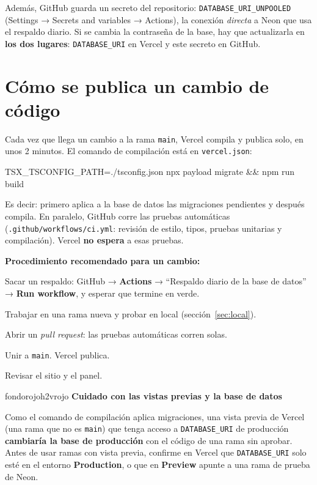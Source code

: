 \documentclass[11pt,letterpaper]{article}
\newcommand{\var}[1]{\nolinkurl{#1}}
\newcommand{\ruta}[1]{\nolinkurl{#1}}
\newcommand{\titulorecuadro}[2]{{\bfseries\color{#1}#2}\par\vspace{2pt}}
\begin{document}
Además, GitHub guarda un secreto del repositorio: \var{DATABASE_URI_UNPOOLED} (Settings → Secrets and variables → Actions), la conexión \emph{directa} a Neon que usa el respaldo diario. Si se cambia la contraseña de la base, hay que actualizarla en \textbf{los dos lugares}: \var{DATABASE_URI} en Vercel y este secreto en GitHub.

\section{Cómo se publica un cambio de código}

Cada vez que llega un cambio a la rama \var{main}, Vercel compila y publica solo, en unos 2 minutos. El comando de compilación está en \ruta{vercel.json}:

\begin{codigo}
TSX_TSCONFIG_PATH=./tsconfig.json npx payload migrate && npm run build
\end{codigo}

Es decir: primero aplica a la base de datos las migraciones pendientes y después compila. En paralelo, GitHub corre las pruebas automáticas (\ruta{.github/workflows/ci.yml}: revisión de estilo, tipos, pruebas unitarias y compilación). Vercel \textbf{no espera} a esas pruebas.

\textbf{Procedimiento recomendado para un cambio:}
\begin{pasos}
\item Sacar un respaldo: GitHub → \textbf{Actions} → ``Respaldo diario de la base de datos'' → \textbf{Run workflow}, y esperar que termine en verde.
\item Trabajar en una rama nueva y probar en local (sección~\ref{sec:local}).
\item Abrir un \emph{pull request}: las pruebas automáticas corren solas.
\item Unir a \var{main}. Vercel publica.
\item Revisar el sitio y el panel.
\end{pasos}

\begin{recuadro}{fondorojo}{h2vrojo}
\titulorecuadro{h2vrojo}{Cuidado con las vistas previas y la base de datos}
Como el comando de compilación aplica migraciones, una vista previa de Vercel (una rama que no es \var{main}) que tenga acceso a \var{DATABASE_URI} de producción \textbf{cambiaría la base de producción} con el código de una rama sin aprobar. Antes de usar ramas con vista previa, confirme en Vercel que \var{DATABASE_URI} solo esté en el entorno \textbf{Production}, o que en \textbf{Preview} apunte a una rama de prueba de Neon.
\end{recuadro}
\end{document}
